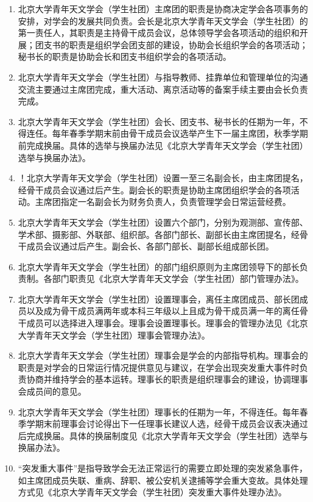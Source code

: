 \begin{enumerate}[resume]
    \item 北京大学青年天文学会（学生社团）主席团的职责是协商决定学会各项事务的安排，对学会的发展共同负责。会长是北京大学青年天文学会（学生社团）的第一责任人，其职责是主持骨干成员会议，总体领导学会各项活动的组织和开展；团支书的职责是组织学会团支部的建设，协助会长组织学会的各项活动；秘书长的职责是协助会长和团支书组织学会的各项活动。
    
    \item 北京大学青年天文学会（学生社团）与指导教师、挂靠单位和管理单位的沟通交流主要通过主席团完成，重大活动、离京活动等的备案手续主要由会长负责完成。
    
    \item 北京大学青年天文学会（学生社团）会长、团支书、秘书长的任期为一年，不得连任。每年春季学期末前由骨干成员会议选举产生下一届主席团，秋季学期前完成换届。具体的选举与换届办法见《北京大学青年天文学会（学生社团）选举与换届办法》。
    
    \item ！北京大学青年天文学会（学生社团）设置一至三名副会长，由主席团提名，经骨干成员会议通过后产生。副会长的职责是协助主席团组织学会的各项活动。主席团指定一名副会长为财务负责人，负责管理学会日常运营经费。
    
    \item 北京大学青年天文学会（学生社团）设置六个部门，分别为观测部、宣传部、学术部、摄影部、外联部、组织部。各部门部长、副部长由主席团提名，经骨干成员会议通过后产生。副会长、各部门部长、副部长组成部长团。
    
    \item 北京大学青年天文学会（学生社团）的部门组织原则为主席团领导下的部长负责制。各部门职责见《北京大学青年天文学会（学生社团）部门管理办法》。
    
    \item 北京大学青年天文学会（学生社团）设置理事会，离任主席团成员、部长团成员以及成为骨干成员满两年或本科三年级以上且成为骨干成员满一年的离任骨干成员可以选择进入理事会。理事会设置理事长。理事会的管理办法见《北京大学青年天文学会（学生社团）理事会管理办法》。
    
    \item 北京大学青年天文学会（学生社团）理事会是学会的内部指导机构。理事会的职责是对学会的日常运行情况提供意见与建议，在学会出现突发重大事件时负责协商并维持学会的基本运转。理事长的职责是组织理事会的建设，协调理事会成员间的意见。
    
    \item 北京大学青年天文学会（学生社团）理事长的任期为一年，不得连任。每年春季学期末前理事会讨论得出下一任理事长建议人选，经骨干成员会议表决通过后完成换届。具体的换届制度见《北京大学青年天文学会（学生社团）选举与换届办法》。
    
    \item “突发重大事件”是指导致学会无法正常运行的需要立即处理的突发紧急事件，如主席团成员失联、重病、辞职、被公安机关逮捕等学会重大变故。具体处理方式见《北京大学青年天文学会（学生社团）突发重大事件处理办法》。
    
\end{enumerate}


